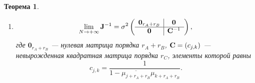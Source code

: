 \documentclass[12pt,a4paper]{article}
\newtheorem{theorem}{Теорема}
\begin{document}
\begin{theorem}
\begin{enumerate}
	    \item 
	    \begin{equation*}
	    \lim_{N \to + \infty} \mathbf{J}^{-1} = \sigma^2 \left( \begin{array}{c|c}
	    \mathbf{0}_{r_A + r_B} & \mathbf{0} \\ \hline
	    \mathbf{0} & \mathbf{C}^{-1}
	    \end{array}  \right),
	    \end{equation*}
	    где $\mathbf{0}_{r_A + r_B}$ --- нулевая матрица порядка $r_A + r_B$, $\mathbf{C} = (c_{j,k})$ --- невырожденная квадратная матрица порядка $r_C$, элементы которой равны
	    \begin{equation*}
	    c_{j, k} = \frac{1}{1 - \overline{\mu_{j+r_A+r_B}} \mu_{k+r_A+r_B}}.
	    \end{equation*}
	\end{enumerate}
\end{theorem}
	
\end{document}
